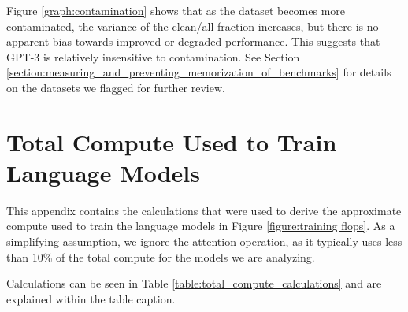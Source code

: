 \documentclass{article}
\begin{document}
Figure \ref{graph:contamination} shows that as the dataset becomes more contaminated, the variance of the clean/all fraction increases, but there is no apparent bias towards improved or degraded performance. This suggests that GPT-3 is relatively insensitive to contamination. See Section \ref{section:measuring_and_preventing_memorization_of_benchmarks} for details on the datasets we flagged for further review.

\clearpage
\section{Total Compute Used to Train Language Models}
\label{appendix:total_compute_calculations}

This appendix contains the calculations that were used to derive the approximate compute used to train the language models in Figure \ref{figure:training flops}. As a simplifying assumption, we ignore the attention operation, as it typically uses less than 10\% of the total compute for the models we are analyzing.

Calculations can be seen in Table \ref{table:total_compute_calculations} and are explained within the table caption.
\end{document}
